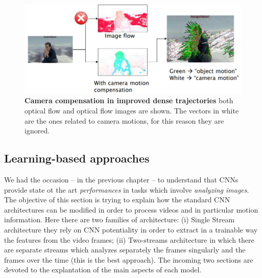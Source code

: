 \begin{figure}[h]
    \centering
    \includegraphics[scale=0.7]{img/improvedense.png}
    \caption{\textbf{Camera compensation in improved dense trajectories} both optical flow and optical flow images are shown. The vectors in white are the ones related to camera motions, for this reason they are ignored.}
\end{figure}

\subsection{Learning-based approaches}
We had the occasion -- in the previous chapter -- to understand that CNNs provide state ot the art \textit{performances} in tasks which involve \textit{analyzing images}. The objective of this section is trying to explain how the standard CNN architectures can be modified in order to process videos and in particular motion information. Here there are two families of architecture: (i) \textsf{Single Stream architecture} they rely on CNN potentiality in order to extract in a trainable way the features from the video frames; (ii) \textsf{Two-streams architecture} in which there are separate streams which analyzes separately the frames singularly and the frames over the time (this is the best approach). The incoming two sections are devoted to the explantation of the main aspects of each model. 

